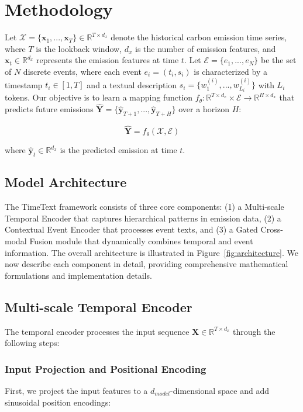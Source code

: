 \section{Methodology}
\label{sec:Methodology}

Let $\mathcal{X} = \{\mathbf{x}_1, ..., \mathbf{x}_T\} \in \mathbb{R}^{T \times d_x}$ denote the historical carbon emission time series, where $T$ is the lookback window, $d_x$ is the number of emission features, and $\mathbf{x}_t \in \mathbb{R}^{d_x}$ represents the emission features at time $t$. Let $\mathcal{E} = \{e_1, ..., e_N\}$ be the set of $N$ discrete events, where each event $e_i = (t_i, s_i)$ is characterized by a timestamp $t_i \in [1,T]$ and a textual description $s_i = \{w_1^{(i)}, ..., w_{L_i}^{(i)}\}$ with $L_i$ tokens. Our objective is to learn a mapping function $f_\theta: \mathbb{R}^{T \times d_x} \times \mathcal{E} \rightarrow \mathbb{R}^{H \times d_x}$ that predicts future emissions $\hat{\mathbf{Y}} = \{\hat{\mathbf{y}}_{T+1}, ..., \hat{\mathbf{y}}_{T+H}\}$ over a horizon $H$:

\begin{equation}
    \hat{\mathbf{Y}} = f_\theta(\mathcal{X}, \mathcal{E})
\end{equation}

where $\hat{\mathbf{y}}_t \in \mathbb{R}^{d_x}$ is the predicted emission at time $t$.

\subsection{Model Architecture}
The TimeText framework consists of three core components: (1) a Multi-scale Temporal Encoder that captures hierarchical patterns in emission data, (2) a Contextual Event Encoder that processes event texts, and (3) a Gated Cross-modal Fusion module that dynamically combines temporal and event information. The overall architecture is illustrated in Figure~\ref{fig:architecture}. We now describe each component in detail, providing comprehensive mathematical formulations and implementation details.

\subsection{Multi-scale Temporal Encoder}
The temporal encoder processes the input sequence $\mathbf{X} \in \mathbb{R}^{T \times d_x}$ through the following steps:

\subsubsection{Input Projection and Positional Encoding}
First, we project the input features to a $d_{model}$-dimensional space and add sinusoidal position encodings:

